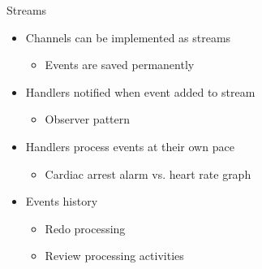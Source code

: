 \documentclass{slide}
\begin{document}
\begin{frame}{Streams}
    \vspace{1mm}
    {\LARGE
    \begin{itemize}
        \item Channels can be implemented as streams
        \begin{itemize}
            \Large\item Events are saved permanently
        \end{itemize}
        \vspace{3mm}
        \item<2-> Handlers notified when event added to stream
        \begin{itemize}
            \Large\item Observer pattern
        \end{itemize}
        \vspace{3mm}
        \item<3-> Handlers process events at their own pace
        \begin{itemize}
            \Large\item Cardiac arrest alarm vs. heart rate graph
        \end{itemize}
        \vspace{3mm}
        \item<4-> Events history
        \begin{itemize}
            \Large\item Redo processing
            \vspace{0.5mm}
            \Large\item Review processing activities
        \end{itemize}
    \end{itemize}
    }
\end{frame}
\end{document}
